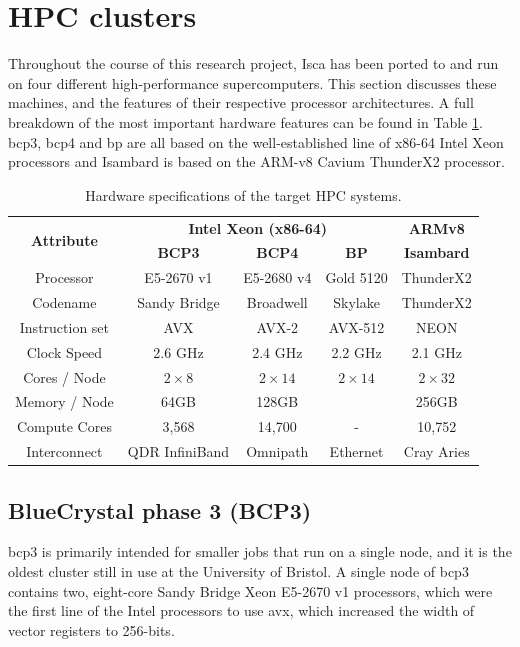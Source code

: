 \documentclass[a4paper,11pt]{report}
\begin{document}
\section{HPC clusters}
Throughout the course of this research project, Isca has been ported to and run on four different high-performance supercomputers. This section discusses these machines, and the features of their respective processor architectures. A full breakdown of the most important hardware features can be found in Table \ref{tbl:hardware}. \gls{bcp3}, \gls{bcp4} and \gls{bp} are all based on the well-established line of x86-64 Intel Xeon processors and Isambard is based on the ARM-v8 Cavium ThunderX2 processor.
\begin{table}[!ht]
\centering
\caption[Hardware specifications of the target HPC systems]{Hardware specifications of the target HPC systems. }
\begin{tabular}{@{\extracolsep{4pt}}ccccc}
\toprule 
\multirow{2}{*}{\textbf{Attribute}} & \multicolumn{3}{c}{\textbf{Intel Xeon (x86-64)}} & \multicolumn{1}{c}{\textbf{ARMv8}}\\

				\cmidrule(lr){2-4} \cmidrule(lr){5-5}

 				& {\textbf{BCP3}} 	& {\textbf{BCP4}} 		& {\textbf{BP}} 		& {\textbf{Isambard}} \\
\midrule
Processor	   		& E5-2670 v1 		& E5-2680 v4			& Gold 5120			& ThunderX2	\\
Codename            	& Sandy Bridge	        & Broadwell         		& Skylake       		   	& ThunderX2   	\\
Instruction set		& AVX			& AVX-2				& AVX-512			& NEON		\\
Clock Speed	   	& 2.6 GHz		    	& 2.4 GHz				& 2.2 GHz				&  2.1 GHz 	\\
Cores / Node		& $2\times8$		& $2\times14$			& $2 \times 14$			& $2\times32$	\\
Memory / Node		& 64GB			& 128GB				&					& 256GB		\\
Compute Cores		& 3,568		    	&14,700				& -					& 10,752 		\\
Interconnect		&  QDR InfiniBand	& Omnipath			& Ethernet			& Cray Aries	\\
\bottomrule
\end{tabular}
\label{tbl:hardware}
\end{table}

\subsection{BlueCrystal phase 3 (BCP3)}
\gls{bcp3} is primarily intended for smaller jobs that run on a single node, and it is the oldest cluster still in use at the University of Bristol. A single node of \gls{bcp3} contains two, eight-core Sandy Bridge Xeon E5-2670 v1 processors, which were the first line of the Intel processors to use \gls{avx}, which increased the width of vector registers to 256-bits. 
\end{document}
